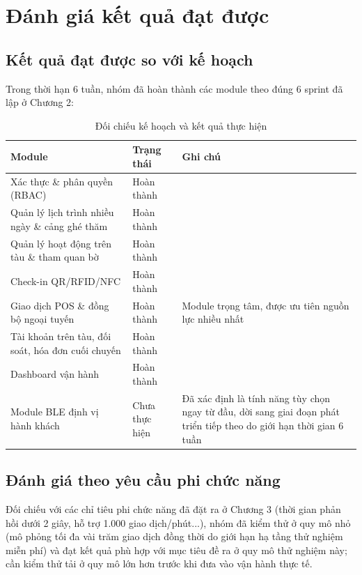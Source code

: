 \section{Đánh giá kết quả đạt được}

\subsection{Kết quả đạt được so với kế hoạch}
Trong thời hạn 6 tuần, nhóm đã hoàn thành các module theo đúng 6 sprint
đã lập ở Chương 2:

\begin{table}[htbp]
    \centering
    \small
    \caption{Đối chiếu kế hoạch và kết quả thực hiện}
    \begin{tabularx}{\textwidth}{|Y|p{2.2cm}|Y|}
        \hline
        \textbf{Module} & \textbf{Trạng thái} & \textbf{Ghi chú} \\
        \hline
        Xác thực \& phân quyền (RBAC) & Hoàn thành & \\
        \hline
        Quản lý lịch trình nhiều ngày \& cảng ghé thăm & Hoàn thành & \\
        \hline
        Quản lý hoạt động trên tàu \& tham quan bờ & Hoàn thành & \\
        \hline
        Check-in QR/RFID/NFC & Hoàn thành & \\
        \hline
        Giao dịch POS \& đồng bộ ngoại tuyến & Hoàn thành & Module trọng
        tâm, được ưu tiên nguồn lực nhiều nhất \\
        \hline
        Tài khoản trên tàu, đối soát, hóa đơn cuối chuyến & Hoàn thành & \\
        \hline
        Dashboard vận hành & Hoàn thành & \\
        \hline
        Module BLE định vị hành khách & Chưa thực hiện & Đã xác định là
        tính năng tùy chọn ngay từ đầu, dời sang giai đoạn phát triển
        tiếp theo do giới hạn thời gian 6 tuần \\
        \hline
    \end{tabularx}
\end{table}

\subsection{Đánh giá theo yêu cầu phi chức năng}
Đối chiếu với các chỉ tiêu phi chức năng đã đặt ra ở Chương 3 (thời gian
phản hồi dưới 2 giây, hỗ trợ 1.000 giao dịch/phút...), nhóm đã kiểm thử ở
quy mô nhỏ (mô phỏng tối đa vài trăm giao dịch đồng thời do giới hạn hạ
tầng thử nghiệm miễn phí) và đạt kết quả phù hợp với mục tiêu đề ra ở quy
mô thử nghiệm này; cần kiểm thử tải ở quy mô lớn hơn trước khi đưa vào
vận hành thực tế.

